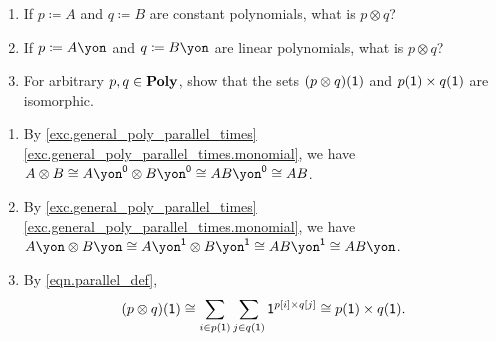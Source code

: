 \documentclass[Book-Poly]{subfiles}
\begin{document}
\begin{exercise} \label{exc.some_parallel_prods}
  \begin{enumerate}
    \item \label{exc.some_parallel_prods.const} If $p\coloneqq A$ and $q\coloneqq B$ are constant polynomials, what is $p\otimes q$?
    \item \label{exc.some_parallel_prods.lin} If $p\coloneqq A\yon$ and $q\coloneqq B\yon$ are linear polynomials, what is $p\otimes q$?
    \item \label{exc.some_parallel_prods.pos_prod} For arbitrary $p,q\in\mathbf{Poly}$, show that the sets $(p\otimes q)(\textsf{1})$ and $p(\textsf{1})\times q(\textsf{1})$ are isomorphic.
    \qedhere
  \end{enumerate}
  \begin{solution}
    \begin{enumerate}
      \item By \cref{exc.general_poly_parallel_times} \cref{exc.general_poly_parallel_times.monomial}, we have $A\otimes B \iso A\yon^\0\otimes B\yon^\0 \iso AB\yon^{\0} \iso AB$.
      \item By \cref{exc.general_poly_parallel_times} \cref{exc.general_poly_parallel_times.monomial}, we have $A\yon\otimes B\yon \iso A\yon^\1\otimes B\yon^\1 \iso AB\yon^\1 \iso AB\yon$.
      \item By \eqref{eqn.parallel_def},
      \[
      (p \otimes q)(\textsf{1}) \cong \sum_{i \in p(\textsf{1})} \sum_{j \in q(\textsf{1})} \textsf{1}^{p[i] \times q[j]} \cong p(\textsf{1}) \times q(\textsf{1}).
      \]
    \end{enumerate}
  \end{solution}
\end{exercise}
\end{document}
